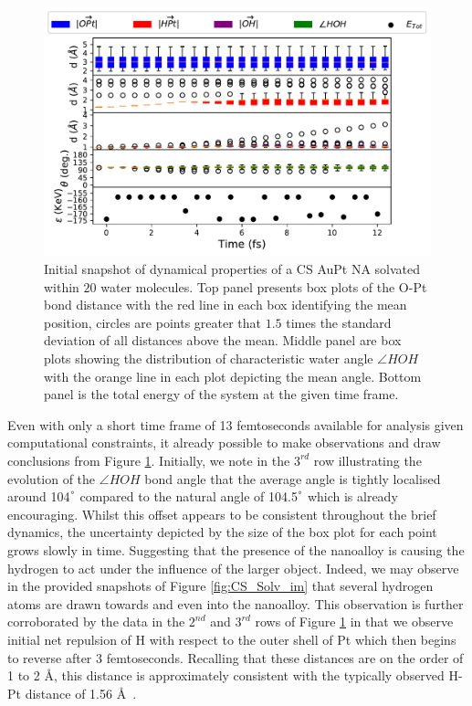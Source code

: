 \begin{figure}
    \centering
    \includegraphics[width=0.95\linewidth]{figures/CS_Solv.pdf}
    \caption{Initial snapshot of dynamical properties of a CS AuPt NA solvated within $20$ water molecules. Top panel presents box plots of the O-Pt bond distance with the red line in each box identifying the mean position, circles are points greater that $1.5$ times the standard deviation of all distances above the mean. Middle panel are box plots showing the distribution of characteristic water angle $\angle HOH$ with the orange line in each plot depicting the mean angle. Bottom panel is the total energy of the system at the given time frame.}
    \label{fig:CS_Solv}
\end{figure}

Even with only a short time frame of 13 femtoseconds available for analysis given computational constraints, it already possible to make observations and draw conclusions from Figure \ref{fig:CS_Solv}. Initially, we note in the $3^{rd}$ row illustrating the evolution of the $\angle HOH$ bond angle that the average angle is tightly localised around 104$^{\degree}$ compared to the natural angle of 104.5$^{\degree}$ which is already encouraging. Whilst this offset appears to be consistent throughout the brief dynamics, the uncertainty depicted by the size of the box plot for each point grows slowly in time. Suggesting that the presence of the nanoalloy is causing the hydrogen to act under the influence of the larger object. Indeed, we may observe in the provided snapshots of Figure \ref{fig:CS_Solv_im} that several hydrogen atoms are drawn towards and even into the nanoalloy. This observation is further corroborated by the data in the $2^{nd}$ and $3^{rd}$ rows of Figure \ref{fig:CS_Solv} in that we observe initial net repulsion of H with respect to the outer shell of Pt which then begins to reverse after 3 femtoseconds. Recalling that these distances are on the order of 1 to 2 \AA, this distance is approximately consistent with the typically observed H-Pt distance of 1.56 \AA \ \cite{B600250C,https://doi.org/10.1002/anie.201813958,doi:10.1021/ja902876v}.

